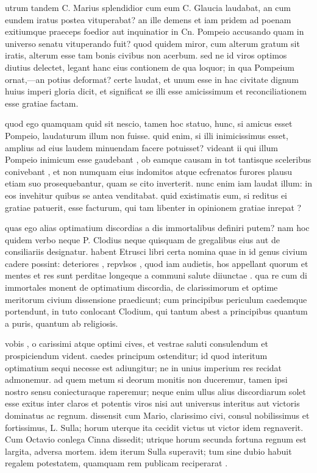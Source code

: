  utrum tandem C. Marius splendidior cum eum C. Glaucia laudabat, an cum eundem iratus postea vituperabat? an ille demens et iam pridem ad poenam exitiumque praeceps foedior aut inquinatior in Cn. Pompeio accusando quam in universo senatu vituperando fuit? quod quidem miror, cum alterum gratum sit iratis, alterum esse tam bonis civibus non acerbum. sed ne id viros optimos diutius delectet, legant hanc eius contionem de qua loquor; in qua Pompeium ornat,—an potius deformat? certe laudat, et unum esse in hac civitate dignum huius imperi gloria dicit, et significat se illi esse amicissimum et reconciliationem esse gratiae factam.

 quod ego quamquam quid sit nescio, tamen hoc statuo, hunc, si amicus esset Pompeio, laudaturum illum non fuisse. quid enim, si illi inimicissimus esset, amplius ad eius laudem minuendam facere potuisset? videant ii qui illum Pompeio inimicum esse gaudebant , ob eamque causam in tot tantisque sceleribus conivebant , et non numquam eius indomitos atque ecfrenatos furores plausu etiam suo prosequebantur, quam se cito inverterit. nunc enim iam laudat illum: in eos invehitur quibus se antea venditabat. quid existimatis eum, si reditus ei gratiae patuerit, esse facturum, qui tam libenter in opinionem gratiae inrepat ?

 quas ego alias optimatium discordias a dis immortalibus definiri putem? nam hoc quidem verbo neque P. Clodius neque quisquam de gregalibus eius aut de consiliariis designatur. habent Etrusci libri certa nomina quae in id genus civium cadere possint: deteriores , repvlsos , quod iam audietis, hos appellant quorum et mentes et res sunt perditae longeque a communi salute diiunctae . qua re cum di immortales monent de optimatium discordia, de clarissimorum et optime meritorum civium dissensione praedicunt; cum principibus periculum caedemque portendunt, in tuto conlocant Clodium, qui tantum abest a principibus quantum a puris, quantum ab religiosis.

 vobis , o carissimi atque optimi cives, et vestrae saluti consulendum et prospiciendum vident. caedes principum ostenditur; id quod interitum optimatium sequi necesse est adiungitur; ne in unius imperium res recidat admonemur. ad quem metum si deorum monitis non duceremur, tamen ipsi nostro sensu coniecturaque raperemur; neque enim ullus alius discordiarum solet esse exitus inter claros et potentis viros nisi aut universus interitus aut victoris dominatus ac regnum. dissensit cum Mario, clarissimo civi, consul nobilissimus et fortissimus, L. Sulla; horum uterque ita cecidit victus ut victor idem regnaverit. Cum Octavio conlega Cinna dissedit; utrique horum secunda fortuna regnum est largita, adversa mortem. idem iterum Sulla superavit; tum sine dubio habuit regalem potestatem, quamquam rem publicam reciperarat .

